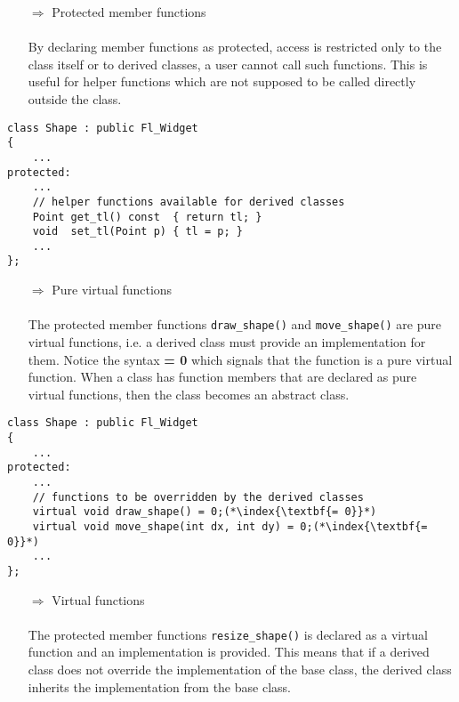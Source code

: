 \documentclass[10pt]{article}
\begin{document}
\begin{enumerate}
\item[$\Rightarrow$] Protected member functions\\ \\ By declaring member functions as protected, access is restricted only to the class itself or to derived classes, a user cannot call such functions. This is useful for helper functions which are not supposed to be called directly outside the class.
\end{enumerate}
\begin{lstlisting}
class Shape : public Fl_Widget
{
    ...
protected:
    ...
    // helper functions available for derived classes
    Point get_tl() const  { return tl; }
    void  set_tl(Point p) { tl = p; }
    ...
};
\end{lstlisting}
\begin{enumerate}
\item[$\Rightarrow$] Pure virtual functions\\ \\ The protected member functions \texttt{draw\_shape()} and \texttt{move\_shape()} are pure virtual functions, i.e. a derived class must provide an implementation for them. Notice the syntax  \textbf{= 0} which signals that the function is a pure virtual function. When a class has function members that are declared as pure virtual functions, then the class becomes an abstract class.
\end{enumerate}
\begin{lstlisting}
class Shape : public Fl_Widget
{
    ...
protected:
    ...
    // functions to be overridden by the derived classes
    virtual void draw_shape() = 0;(*\index{\textbf{= 0}}*)
    virtual void move_shape(int dx, int dy) = 0;(*\index{\textbf{= 0}}*)
    ...
};
\end{lstlisting}
\begin{enumerate}
\item[$\Rightarrow$] Virtual functions\\ \\ The protected member functions \texttt{resize\_shape()} is declared as a virtual function and an implementation is provided. This means that if a derived class does not override the implementation of the base class, the derived class inherits the implementation from the base class.
\end{enumerate}
\end{document}

